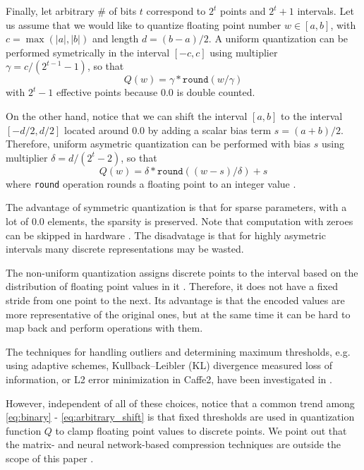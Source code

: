\documentclass{article}
\begin{document}
Finally, let arbitrary \# of bits $t$ correspond to $2^t$ points and $2^t+1$ intervals. Let us assume that we would like to quantize floating point number $w \in [a,b]$, with $c = \max(|a|,|b|)$ and length $d = (b - a)/2$. A uniform quantization can be performed symetrically in the interval $[-c,c]$ using multiplier $\gamma  = c/(2^{t-1}-1)$, so that
\begin{equation}
Q(w) = \gamma * \texttt{round}( w / \gamma ) 
\label{eq:arbitrary}
\end{equation}
with $2^t-1$ effective points because $0.0$ is double counted.

On the other hand, notice that we can shift the interval $[a,b]$ to the interval $[-d/2,d/2]$ located around $0.0$ by adding a scalar bias term $s = (a+b)/2$. Therefore, uniform asymetric quantization can be performed with bias $s$ using multiplier $\delta  = d/(2^{t}-2)$, so that
\begin{equation}
Q(w) = \delta * \texttt{round}( (w-s)/ \delta ) + s
\label{eq:arbitrary_shift}
\end{equation}
where \texttt{round} operation rounds a floating point to an integer value \cite{Wen2016,Jacob2017,Krishnamoorthi2018}. 

The advantage of symmetric quantization is that for sparse parameters, with a lot of $0.0$ elements, the sparsity is preserved. Note that computation with zeroes can be skipped in hardware \cite{Albericio2016, Venkatesh2016, Reagan2016, Chen2017, Kim2017, Parashar2017}. The disadvatage is that for highly asymetric intervals many discrete representations may be wasted.

The non-uniform quantization assigns discrete points to the interval based on the distribution of floating point values in it \cite{Bagherinezhad2017,Wang2018}. Therefore, it does not have a fixed stride from one point to the next. Its advantage is that the encoded values are more representative of the original ones, but at the same time it can be hard to map back and perform operations with them.     

The techniques for handling outliers and determining maximum thresholds, e.g. using adaptive schemes, Kullback–Leibler (KL) divergence measured loss of information, or L2 error minimization in Caffe2, have been investigated in \cite{jia2014caffe,Migasz2017,Zhou2017,Park2018}.  

However, independent of all of these choices, notice that a common trend among \eqref{eq:binary} - \eqref{eq:arbitrary_shift} is that fixed thresholds are used in quantization function $Q$ to clamp floating point values to discrete points. We point out that the matrix- and neural network-based compression techniques are outside the scope of this paper \cite{Gong2014,Denton2014,Jaderberg2014,Mishra2018}.
\end{document}
